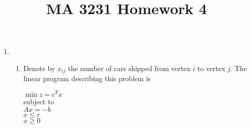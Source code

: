 \documentclass{article}
\title{MA 3231 Homework 4}
\date{}
\author{}
\begin{document}
\maketitle

\begin{enumerate}

\item

\begin{enumerate}
\item 

Denote by $x_{ij}$ the number of cars shipped from vertex $i$ to vertex $j$. The linear program describing this problem is

$\min z = c^Tx$\\
subject to \\
$Ax = -b$\\
$x \leq r$ \\
$x \geq 0$ \\


\end{enumerate}
\end{enumerate}
\end{document}
